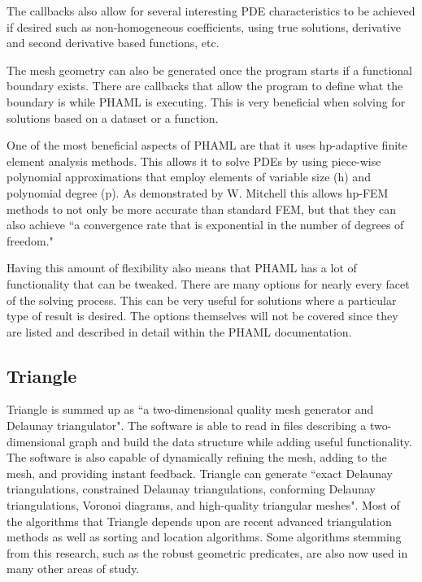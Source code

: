 The callbacks also allow for several interesting PDE characteristics to be achieved if desired such as non-homogeneous coefficients, using true solutions, derivative and second derivative based functions, etc.

The mesh geometry can also be generated once the program starts if a functional boundary exists.  There are callbacks that allow the program to define what the boundary is while PHAML is executing.  This is very beneficial when solving for solutions based on a dataset or a function.

One of the most beneficial aspects of PHAML are that it uses hp-adaptive finite element analysis methods.  This allows it to solve PDEs by using piece-wise polynomial approximations that employ elements of variable size (h) and polynomial degree (p). As demonstrated by W. Mitchell this allows hp-FEM methods to not only be more accurate than standard FEM, but that they can also achieve ``a convergence rate that is exponential in the number of degrees of freedom." \citep{mitchell:hp}

Having this amount of flexibility also means that PHAML has a lot of functionality that can be tweaked.  There are many options for nearly every facet of the solving process.  This can be very useful for solutions where a particular type of result is desired.  The options themselves will not be covered since they are listed and described in detail within the PHAML documentation.\citep{phamldoc}



\subsection{Triangle}\label{sec:chp2triangle}

Triangle is summed up as ``a two-dimensional quality mesh generator and Delaunay triangulator".\citep{shewchuk96b}  The software is able to read in files describing a two-dimensional graph and build the data structure while adding useful functionality.  The software is also capable of dynamically refining the mesh, adding to the mesh, and providing instant feedback.  Triangle can generate ``exact Delaunay triangulations, constrained Delaunay triangulations, conforming Delaunay triangulations, Voronoi diagrams, and high-quality triangular meshes". \citep{Triangle:website} Most of the algorithms that Triangle depends upon are recent advanced triangulation methods as well as sorting and location algorithms.  Some algorithms stemming from this research, such as the robust geometric predicates, are also now used in many other areas of study. \citep{shewchuk97a}

